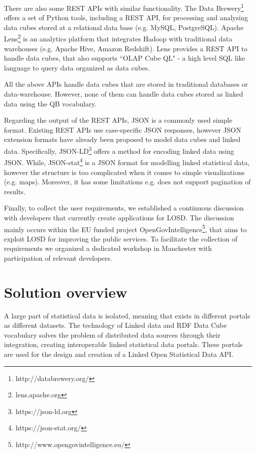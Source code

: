 \documentclass{llncs}
\begin{document}
There are also some REST APIs with similar functionality. The Data Brewery\footnote{http://databrewery.org/} offers a set of Python tools, including a REST API, for processing and analysing data cubes stored at a relational data base (e.g. MySQL, PostgreSQL). Apache Lens\footnote{lens.apache.org} is an analytics platform that integrates Hadoop with traditional data warehouses (e.g. Apache Hive, Amazon Redshift). Lens provides a REST API to handle data cubes, that also supports ``OLAP Cube QL" - a high level SQL like language to query data organized as data cubes.

All the above APIs handle data cubes that are stored in traditional databases or data-warehouse. However, none of them can handle data cubes  stored as linked data using the QB vocabulary.  

Regarding the output of the REST APIs, JSON is a commonly used simple format. Existing REST APIs use 
case-specific JSON responses, however JSON extension formats have already been proposed to model data cubes and linked data. Specifically, JSON-LD\footnote{https://json-ld.org} offers a method for encoding linked data using JSON. While, JSON-stat\footnote{https://json-stat.org/} is a JSON format for modelling linked statistical data, however the structure is too complicated when it comes to simple visualizations (e.g. maps). Moreover, it has some limitations e.g. does not support pagination of results. 

Finally, to collect the user requirements, we established a continuous discussion with developers that currently create applications for LOSD. The discussion mainly occurs within the EU funded project OpenGovIntelligence\footnote{http://www.opengovintelligence.eu/}, that aims to exploit LOSD for improving the public services. To facilitate the collection of requirements we organized a dedicated workshop in Manchester with participation of relevant developers. 

\section{Solution overview}\label{sec:overview}

A large part of statistical data is isolated, meaning that exists in different portals as different datasets. The technology of Linked data and RDF Data Cube vocabulary solves the problem of distributed data sources through their integration, creating interoperable linked statistical data portals. These portals are used for the design and creation of a Linked Open Statistical Data API. 
 
\end{document}
